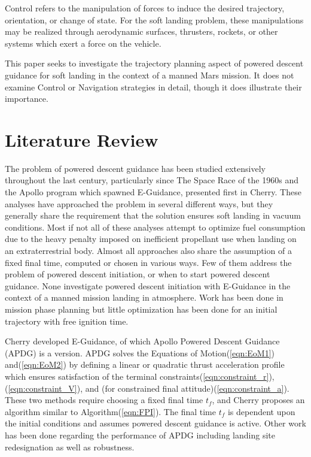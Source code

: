Control refers to the manipulation of forces to induce the desired trajectory, orientation, or change of state. For the soft landing problem, these manipulations may be realized through aerodynamic surfaces, thrusters, rockets, or other systems which exert a force on the vehicle.

This paper seeks to investigate the trajectory planning aspect of powered descent guidance for soft landing in the context of a manned Mars mission. It does not examine Control or Navigation strategies in detail, though it does illustrate their importance.

\section{Literature Review}
The problem of powered descent guidance has been studied extensively throughout the last century, particularly since The Space Race of the 1960s and the Apollo program which spawned E-Guidance, presented first in Cherry\:\cite{CHERRY}. These analyses have approached the problem in several different ways, but they generally share the requirement that the solution ensures soft landing in vacuum conditions. Most if not all of these analyses attempt to optimize fuel consumption due to the heavy penalty imposed on inefficient propellant use when landing on an extraterrestrial body. Almost all approaches also share the assumption of a fixed final time, computed or chosen in various ways. Few of them address the problem of powered descent initiation, or when to start powered descent guidance. None investigate powered descent initiation with E-Guidance in the context of a manned mission landing in atmosphere. Work has been done in mission phase planning but little optimization has been done for an  initial trajectory with free ignition time.

Cherry developed E-Guidance, of which Apollo Powered Descent Guidance (APDG) is a version. APDG solves the Equations of Motion\:(\ref{eqn:EoM1}) and\:(\ref{eqn:EoM2}) by defining a linear or quadratic thrust acceleration profile which ensures satisfaction of the terminal constraints\:(\ref{eqn:constraint_r}),\:(\ref{eqn:constraint_V}), and (for constrained final attitude)\:(\ref{eqn:constraint_a}). These two methods require choosing a fixed final time $t_f$, and Cherry proposes an algorithm similar to Algorithm\:(\ref{eqn:FPI}). The final time $t_f$ is dependent upon the initial conditions and assumes powered descent guidance is active. Other work has been done regarding the performance of APDG including landing site redesignation\:\cite{SOSTARIC,PLOEN} as well as robustness\:\cite{KLUMPP}. 

